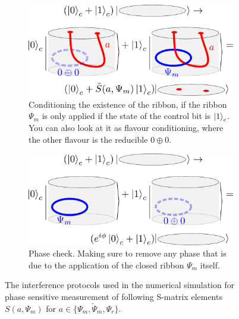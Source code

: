 \documentclass[two column]{article}
\begin{document}
\begin{figure}
\begin{subfigure}{0.47\textwidth}
    \includegraphics[width=\linewidth]{Figures/intefEx.pdf}
    \caption{Conditioning the existence of the ribbon, if the ribbon $\Psi_m$ is only applied if the state of the control bit is $\ket{1}_c$. You can also look at it as flavour conditioning, where the other flavour is the reducible $0\oplus 0$.}
    \label{fig:cond_ex}
\end{subfigure}\hfill
\begin{subfigure}{0.47\textwidth}
    \includegraphics[width=\linewidth]{Figures/phaseCheck.pdf}
    \caption{Phase check. Making sure to remove any phase that is due to the application of the closed ribbon $\Psi_m$ itself.}
    \label{fig:phase_check}
\end{subfigure}
\caption{The interference protocols used in the numerical simulation for phase sensitive measurement of following S-matrix elements $S(a, \Psi_m)$ for $a\in\{\Psi_m, \tilde{\Psi}_m, \Psi_r\}$.}
\label{fig:S-mat}
\end{figure}
\end{document}
